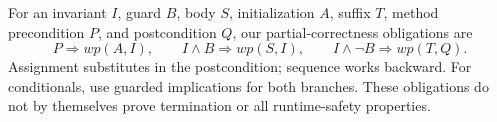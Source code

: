 \par\noindent\begin{minipage}{\linewidth}
For an invariant $I$, guard $B$, body $S$, initialization $A$, suffix $T$,
method precondition $P$, and postcondition $Q$, our partial-correctness obligations are
\[
 P\Rightarrow wp(A,I),\qquad
 I\land B\Rightarrow wp(S,I),\qquad
 I\land\neg B\Rightarrow wp(T,Q).
\]
Assignment substitutes in the postcondition; sequence works backward.
For conditionals, use guarded implications for both branches. These obligations
do not by themselves prove termination or all runtime-safety properties.

\end{minipage}\par
